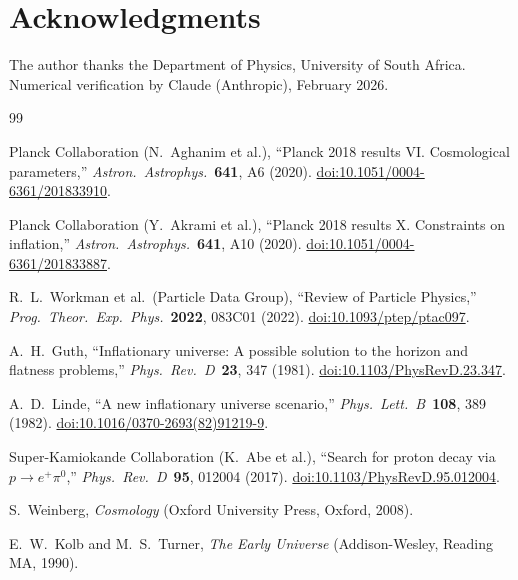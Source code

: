 \documentclass[12pt,a4paper]{article}
\theoremstyle{definition}
\theoremstyle{remark}
\begin{document}
\section*{Acknowledgments}
The author thanks the Department of Physics, University of South Africa.
Numerical verification by Claude (Anthropic), February 2026.

\begin{thebibliography}{99}

Planck Collaboration (N.~Aghanim et al.),
``Planck 2018 results VI. Cosmological parameters,''
\textit{Astron.\ Astrophys.}\ \textbf{641}, A6 (2020).
\href{https://doi.org/10.1051/0004-6361/201833910}{doi:10.1051/0004-6361/201833910}.

Planck Collaboration (Y.~Akrami et al.),
``Planck 2018 results X. Constraints on inflation,''
\textit{Astron.\ Astrophys.}\ \textbf{641}, A10 (2020).
\href{https://doi.org/10.1051/0004-6361/201833887}{doi:10.1051/0004-6361/201833887}.

R.~L.~Workman et al.\ (Particle Data Group),
``Review of Particle Physics,''
\textit{Prog.\ Theor.\ Exp.\ Phys.}\ \textbf{2022}, 083C01 (2022).
\href{https://doi.org/10.1093/ptep/ptac097}{doi:10.1093/ptep/ptac097}.

A.~H.~Guth,
``Inflationary universe: A possible solution to the horizon and flatness problems,''
\textit{Phys.\ Rev.\ D}\ \textbf{23}, 347 (1981).
\href{https://doi.org/10.1103/PhysRevD.23.347}{doi:10.1103/PhysRevD.23.347}.

A.~D.~Linde,
``A new inflationary universe scenario,''
\textit{Phys.\ Lett.\ B}\ \textbf{108}, 389 (1982).
\href{https://doi.org/10.1016/0370-2693(82)91219-9}{doi:10.1016/0370-2693(82)91219-9}.

Super-Kamiokande Collaboration (K.~Abe et al.),
``Search for proton decay via $p \to e^+ \pi^0$,''
\textit{Phys.\ Rev.\ D}\ \textbf{95}, 012004 (2017).
\href{https://doi.org/10.1103/PhysRevD.95.012004}{doi:10.1103/PhysRevD.95.012004}.

S.~Weinberg,
\textit{Cosmology}
(Oxford University Press, Oxford, 2008).

E.~W.~Kolb and M.~S.~Turner,
\textit{The Early Universe}
(Addison-Wesley, Reading MA, 1990).


\end{thebibliography}
\end{document}
